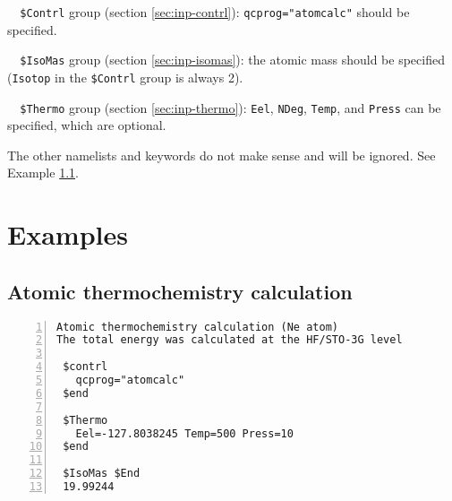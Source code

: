 \documentclass[12pt,english]{extarticle}
\begin{document}
\begin{description}
\item[ ]\verb|  $Contrl| group (section \ref{sec:inp-contrl}): \verb|qcprog="atomcalc"| should be specified.
\item[ ]\verb|  $IsoMas| group (section \ref{sec:inp-isomas}): the atomic mass should be specified (\verb|Isotop| in the \verb|$Contrl| group is always 2).
\item[ ]\verb|  $Thermo| group (section \ref{sec:inp-thermo}): \verb|Eel|, \verb|NDeg|, \verb|Temp|, and \verb|Press| can be specified, which are optional.
\end{description}
The other namelists and keywords do not make sense and will be ignored. See Example \ref{sec:exp1}.

\pagebreak{}


\section{Examples} \label{part:examp}

\subsection{Atomic thermochemistry calculation} \label{sec:exp1}

\begin{Verbatim}[frame=single,label=example,labelposition=topline,numbers=left,rulecolor=\color{blue},fontsize=\footnotesize,baselinestretch=1.0]
Atomic thermochemistry calculation (Ne atom)
The total energy was calculated at the HF/STO-3G level

 $contrl
   qcprog="atomcalc"
 $end

 $Thermo
   Eel=-127.8038245 Temp=500 Press=10
 $end

 $IsoMas $End
 19.99244
\end{Verbatim}
\end{document}

